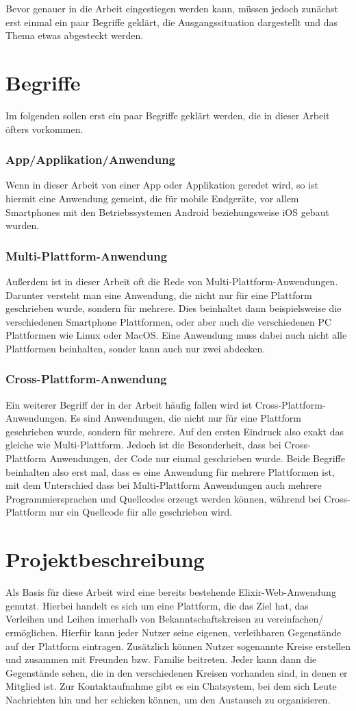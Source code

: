 Bevor genauer in die Arbeit eingestiegen werden kann, müssen jedoch zunächst erst einmal ein paar Begriffe geklärt, die Ausgangssituation dargestellt und das Thema etwas abgesteckt werden.

\section{Begriffe}
Im folgenden sollen erst ein paar Begriffe geklärt werden, die in dieser Arbeit öfters vorkommen.
\subsubsection{App/Applikation/Anwendung}
Wenn in dieser Arbeit von einer App oder Applikation geredet wird, so ist hiermit eine Anwendung gemeint, die für mobile Endgeräte, vor allem Smartphones mit den Betriebssystemen Android beziehungsweise iOS gebaut wurden.
\subsubsection{Multi-Plattform-Anwendung}
Außerdem ist in dieser Arbeit oft die Rede von Multi-Plattform-Anwendungen. Darunter versteht man eine Anwendung, die nicht nur für eine Plattform geschrieben wurde, sondern für mehrere. Dies beinhaltet dann beispielsweise die verschiedenen Smartphone Plattformen, oder aber auch die verschiedenen PC Plattformen wie Linux oder MacOS. Eine Anwendung muss dabei auch nicht alle Plattformen beinhalten, sonder kann auch nur zwei abdecken. 
\subsubsection{Cross-Plattform-Anwendung}
Ein weiterer Begriff der in der Arbeit häufig fallen wird ist Cross-Plattform-Anwendungen. Es sind Anwendungen, die nicht nur für eine Plattform geschrieben wurde, sondern für mehrere. Auf den ersten Eindruck also exakt das gleiche wie Multi-Plattform. Jedoch ist die Besonderheit, dass bei Cross-Plattform Anwendungen, der Code nur einmal geschrieben wurde. Beide Begriffe beinhalten also erst mal, dass es eine Anwendung für mehrere Plattformen ist, mit dem Unterschied dass bei Multi-Plattform Anwendungen auch mehrere Programmiersprachen und Quellcodes erzeugt werden können, während bei Cross-Plattform nur ein Quellcode für alle geschrieben wird.


\section{Projektbeschreibung}
Als Basis für diese Arbeit wird eine bereits bestehende Elixir-Web-Anwendung genutzt. Hierbei handelt  es sich um eine Plattform, die das Ziel hat, das Verleihen und Leihen innerhalb von Bekanntschaftskreisen zu vereinfachen/ ermöglichen. Hierfür kann jeder Nutzer seine eigenen, verleihbaren Gegenstände auf der Plattform eintragen. Zusätzlich können Nutzer sogenannte Kreise erstellen und zusammen mit Freunden bzw. Familie beitreten. Jeder kann dann die Gegenstände sehen, die in den verschiedenen Kreisen vorhanden sind, in denen er Mitglied ist. Zur Kontaktaufnahme gibt es ein Chatsystem, bei dem sich Leute Nachrichten hin und her schicken können, um den Austausch zu organisieren.

